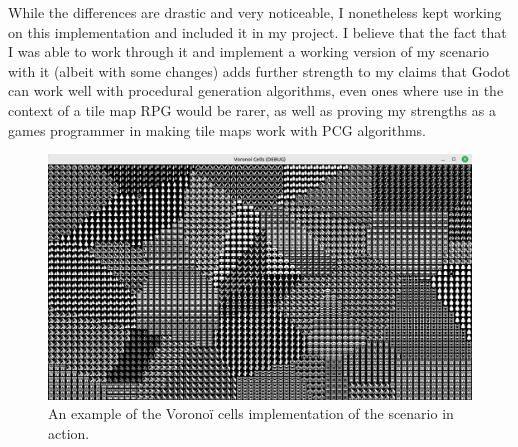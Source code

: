 While the differences are drastic and very noticeable, I nonetheless kept working on this implementation and included it in my project. I believe that the fact that I was able to work through it and implement a working version of my scenario with it (albeit with some changes) adds further strength to my claims that Godot can work well with procedural generation algorithms, even ones where use in the context of a tile map RPG would be rarer, as well as proving my strengths as a games programmer in making tile maps work with PCG algorithms.

\begin{figure}[H]
    \centering
    \includegraphics[width=\textwidth]{Images/voronoi-example.png}
    \caption{An example of the Voronoï cells implementation of the scenario in action.}
    \label{fig:voronoi-example}
\end{figure}
